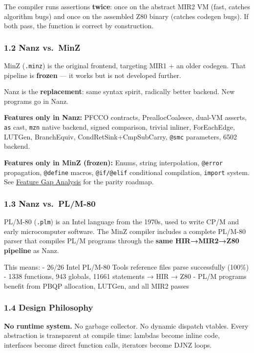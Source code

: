 \documentclass[
  11pt,
]{article}
\begin{document}
The compiler runs assertions \textbf{twice}: once on the abstract MIR2
VM (fast, catches algorithm bugs) and once on the assembled Z80 binary
(catches codegen bugs). If both pass, the function is correct by
construction.

\subsubsection{1.2 Nanz vs.~MinZ}\label{nanz-vs.-minz}

MinZ (\texttt{.minz}) is the original frontend, targeting MIR1 + an
older codegen. That pipeline is \textbf{frozen} --- it works but is not
developed further.

Nanz is the \textbf{replacement}: same syntax spirit, radically better
backend. New programs go in Nanz.

\textbf{Features only in Nanz:} PFCCO contracts, PreallocCoalesce,
dual-VM asserts, \texttt{as} cast, \texttt{mzn} native backend, signed
comparison, trivial inliner, ForEachEdge, LUTGen, BranchEquiv,
CondRetSink+CmpSubCarry, \texttt{@smc} parameters, 6502 backend.

\textbf{Features only in MinZ (frozen):} Enums, string interpolation,
\texttt{@error} propagation, \texttt{@define} macros, \texttt{@if/@elif}
conditional compilation, \texttt{import} system. See
\href{MinZ_vs_Nanz_Feature_Gap.md}{Feature Gap Analysis} for the parity
roadmap.

\subsubsection{1.3 Nanz vs.~PL/M-80}\label{nanz-vs.-plm-80}

PL/M-80 (\texttt{.plm}) is an Intel language from the 1970s, used to
write CP/M and early microcomputer software. The MinZ compiler includes
a complete PL/M-80 parser that compiles PL/M programs through the
\textbf{same HIR→MIR2→Z80 pipeline} as Nanz.

This means: - 26/26 Intel PL/M-80 Tools reference files parse
successfully (100\%) - 1338 functions, 943 globals, 11661 statements →
HIR → Z80 - PL/M programs benefit from PBQP allocation, LUTGen, and all
MIR2 passes

\subsubsection{1.4 Design Philosophy}\label{design-philosophy}

\textbf{No runtime system.} No garbage collector. No dynamic dispatch
vtables. Every abstraction is transparent at compile time: lambdas
become inline code, interfaces become direct function calls, iterators
become DJNZ loops.
\end{document}
